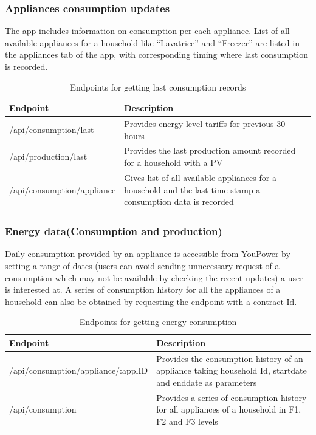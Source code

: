 \subsubsection{Appliances consumption updates}
The app includes information on consumption per each appliance. List of all available appliances for a household like ``Lavatrice'' and ``Freezer'' are listed in the appliances tab of the app, with corresponding timing where last consumption is recorded.
\begin{table}[h!]
\caption{Endpoints for getting last consumption records}\label{tab:app_nav}
\begin{center} \footnotesize 
\begin{tabular}{ l p{6cm}}
\hline
\textbf{Endpoint}  &
\textbf{Description}  \\ \hline


/api/consumption/last
  & 
Provides energy level tariffs for previous 30 hours \\ 
/api/production/last & Provides the last production amount recorded for a household with a PV \\ 
/api/consumption/appliance & Gives list of all available appliances for a household and the last time stamp a consumption data is recorded \\ 
 \hline
\end{tabular}
\end{center} 
\end{table}
\subsubsection{Energy data(Consumption and production)
}
Daily consumption provided by an appliance is accessible from YouPower by setting a range of dates (users can avoid sending unnecessary request of a consumption which may not be available by checking the recent updates) a user is interested at. A series of consumption history for all the appliances of a household can also be obtained by requesting the endpoint with a contract Id.
\begin{table}[h!]
\caption{Endpoints for getting energy consumption}\label{tab:app_nav}
\begin{center} \footnotesize 
\begin{tabular}{ l p{6cm}}
\hline
\textbf{Endpoint}  &
\textbf{Description}  \\ \hline

/api/consumption/appliance/:applID
  & 
Provides the consumption history of an appliance taking household Id, startdate and enddate as parameters \\ 
/api/consumption & Provides a series of consumption history for all appliances of a household in F1, F2 and F3 levels \\ 
 \hline
\end{tabular}
\end{center} 
\end{table}

